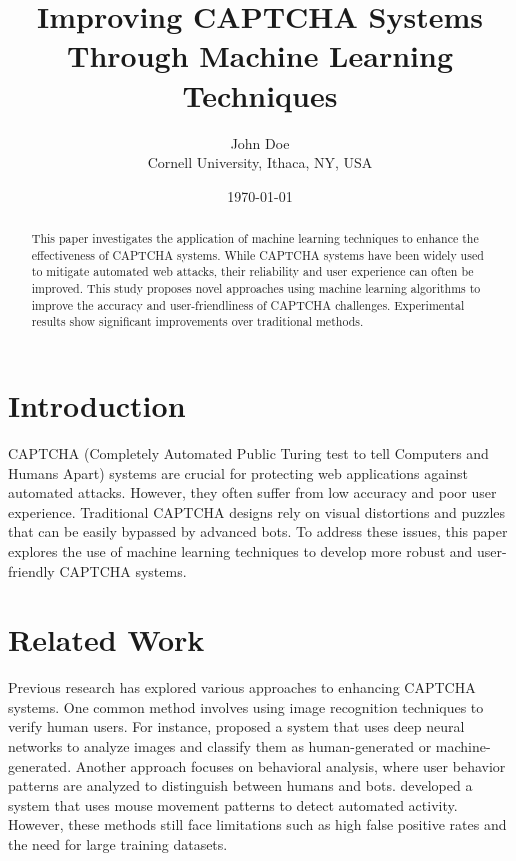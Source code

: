 \documentclass{article}
\title{Improving CAPTCHA Systems Through Machine Learning Techniques}
\author{John Doe \\
        Cornell University, Ithaca, NY, USA \\
        \email{johndoe@cornell.edu}}
\date{\today}
\begin{document}
\maketitle

\begin{abstract}
This paper investigates the application of machine learning techniques to enhance the effectiveness of CAPTCHA systems. While CAPTCHA systems have been widely used to mitigate automated web attacks, their reliability and user experience can often be improved. This study proposes novel approaches using machine learning algorithms to improve the accuracy and user-friendliness of CAPTCHA challenges. Experimental results show significant improvements over traditional methods.
\end{abstract}

\section{Introduction}
CAPTCHA (Completely Automated Public Turing test to tell Computers and Humans Apart) systems are crucial for protecting web applications against automated attacks. However, they often suffer from low accuracy and poor user experience. Traditional CAPTCHA designs rely on visual distortions and puzzles that can be easily bypassed by advanced bots. To address these issues, this paper explores the use of machine learning techniques to develop more robust and user-friendly CAPTCHA systems.

\section{Related Work}
Previous research has explored various approaches to enhancing CAPTCHA systems. One common method involves using image recognition techniques to verify human users. For instance, \cite{wang2021enhancing} proposed a system that uses deep neural networks to analyze images and classify them as human-generated or machine-generated. Another approach focuses on behavioral analysis, where user behavior patterns are analyzed to distinguish between humans and bots. \cite{zhang2020behavioral} developed a system that uses mouse movement patterns to detect automated activity. However, these methods still face limitations such as high false positive rates and the need for large training datasets.
\end{document}
